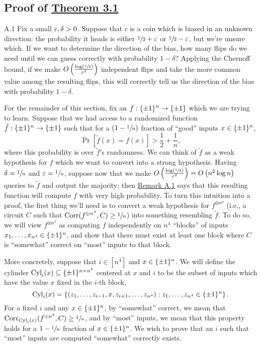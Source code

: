 \documentclass[11pt]{article}
\begin{document}
\subsection*{Proof of \hyperref[t-3-1]{Theorem 3.1}}

\begin{remark}{A.1}\label{r-a-1}
    Fix a small $\varepsilon, \delta > 0$. Suppose that $c$ is a coin which is biased in an unknown direction: the probability it heads is either $\sfrac{1}{2} + \varepsilon$ or $\sfrac{1}{2} - \varepsilon$, but we're unsure which. If we want to determine the direction of the bias, how many flips do we need until we can guess correctly with probability $1 - \delta$? Applying the Chernoff bound, if we make $O\left(\frac{\log \left(\sfrac{1}{\delta}\right)}{\varepsilon^2}\right)$ independent flips and take the more common value among the resulting flips, this will correctly tell us the direction of the bias with probability $1 - \delta$.
\end{remark}

For the remainder of this section, fix an $f : \{\pm 1\}^n \rightarrow \{\pm 1\}$ which we are trying to learn. Suppose that we had access to a randomized function $\tilde{f} : \{\pm 1\}^n \rightarrow \{\pm 1\}$ such that for a $(1 - \sfrac{1}{n})$ fraction of ``good'' inputs $x \in \{\pm 1\}^n$, 
\begin{equation*}
    \Pr[\tilde{f}(x) = f(x)] > \frac{1}{2} + \frac{1}{n},
\end{equation*}
where this probability is over $\tilde{f}$'s randomness. We can think of $\tilde{f}$ as a weak hypothesis for $f$ which we want to convert into a strong hypothesis. Having $\delta = \sfrac{1}{n}$ and $\varepsilon = \sfrac{1}{n}$, suppose now that we make $O\left(\frac{\log (\sfrac{1}{\delta})}{\varepsilon^2}\right) = O\left(n^2 \log n\right)$ queries to $\tilde{f}$ and output the majority; then \hyperref[r-a-1]{Remark A.1} says that this resulting function will compute $f$ with very high probability. To turn this intuition into a proof, the first thing we'll need is to convert a weak hypothesis for $f^{\oplus n^4}$ (i.e., a circuit $C$ such that $\mathrm{Corr}(f^{\oplus n^4}, C) \geq \sfrac{1}{n}$) into something resembling $\tilde{f}$. To do so, we will view $f^{\oplus n^4}$ as computing $f$ independently on $n^4$ ``blocks'' of inputs $x_1, \ldots, x_{n^4} \in \{\pm 1\}^n$, and show that there must exist at least one block where $C$ is ``somewhat'' correct on ``most'' inputs to that block.

More concretely, suppose that $i \in [n^4]$ and $x \in \{\pm 1\}^n$. We will define the cylinder $\textup{Cyl}_i(x) \subseteq \{\pm 1\}^{n \times n^4}$ centered at $x$ and $i$ to be the subset of inputs which have the value $x$ fixed in the $i$-th block,
\begin{equation*}
    \textup{Cyl}_i(x) = \left\{(z_1, \ldots, z_{i - 1}, x, z_{i + 1}, \ldots, z_{n^4}) : z_1, \ldots, z_{n^4} \in \{\pm 1\}^n\right\}.
\end{equation*}
For a fixed $i$ and any $x \in \{\pm 1\}^n$, by ``somewhat'' correct, we mean that $\mathrm{Corr}_{\textup{Cyl}_i(x)}(f^{\oplus n^4}, C) \geq \sfrac{1}{n}$, and by ``most'' inputs, we mean that this property holds for a $1 - \sfrac{1}{n}$ fraction of $x \in \{\pm 1\}^n$. We wish to prove that an $i$ such that ``most'' inputs are computed ``somewhat'' correctly exists.
\end{document}
